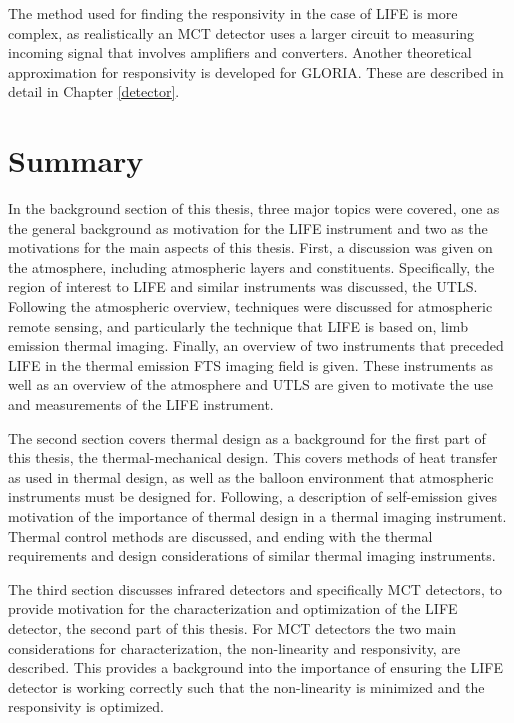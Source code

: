 The method used for finding the responsivity in the case of LIFE is more complex, as realistically an MCT detector uses a larger circuit to measuring incoming signal that involves amplifiers and converters. Another theoretical approximation for responsivity is developed for GLORIA. These are described in detail in Chapter \ref{detector}.


\section {Summary}

In the background section of this thesis, three major topics were covered, one as the general background as motivation for the LIFE instrument and two as the motivations for the main aspects of this thesis. First, a discussion was given on the atmosphere, including atmospheric layers and constituents. Specifically, the region of interest to LIFE and similar instruments was discussed, the UTLS. Following the atmospheric overview, techniques were discussed for atmospheric remote sensing, and particularly the technique that LIFE is based on, limb emission thermal imaging. Finally, an overview of two instruments that preceded LIFE in the thermal emission FTS imaging field is given. These instruments as well as an overview of the atmosphere and UTLS are given to motivate the use and measurements of the LIFE instrument.

The second section covers thermal design as a background for the first part of this thesis, the thermal-mechanical design. This covers methods of heat transfer as used in thermal design, as well as the balloon environment that atmospheric instruments must be designed for. Following, a description of self-emission gives motivation of the importance of thermal design in a thermal imaging instrument. Thermal control methods are discussed, and ending with the thermal requirements and design considerations of similar thermal imaging instruments.

The third section discusses infrared detectors and specifically MCT detectors, to provide motivation for the characterization and optimization of the LIFE detector, the second part of this thesis. For MCT detectors the two main considerations for characterization, the non-linearity and responsivity, are described. This provides a background into the importance of ensuring the LIFE detector is working correctly such that the non-linearity is minimized and the responsivity is optimized. 